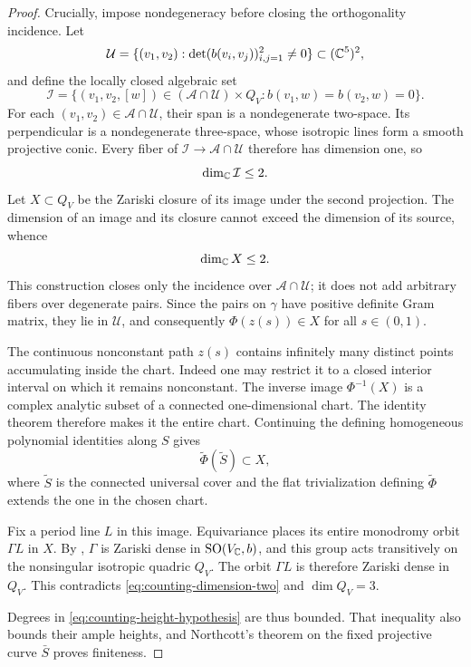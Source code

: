 \begin{proof}
Crucially, impose nondegeneracy before closing the orthogonality
incidence.  Let
\[
 \mathcal U=
 \{(v_1,v_2):\det(b(v_i,v_j))_{i,j=1}^2\ne0\}
 \subset(\mathbb C^5)^2,
\]
and define the locally closed algebraic set
\[
 \mathcal I=
 \{(v_1,v_2,[w])\in(\mathcal A\cap\mathcal U)\times Q_V:
       b(v_1,w)=b(v_2,w)=0\}.
\]
For each $(v_1,v_2)\in\mathcal A\cap\mathcal U$, their span is a
nondegenerate two-space.  Its perpendicular is a nondegenerate
three-space, whose isotropic lines form a smooth projective conic.
Every fiber of $\mathcal I\to\mathcal A\cap\mathcal U$ therefore
has dimension one, so
\[
 \dim_{\mathbb C}\mathcal I\le2.
\]
Let $X\subset Q_V$ be the Zariski closure of its image under
the second projection.  The dimension of an image and its closure
cannot exceed the dimension of its source, whence
\begin{equation}\label{eq:counting-dimension-two}
 \dim_{\mathbb C}X\le2.
\end{equation}
This construction closes only the incidence over
$\mathcal A\cap\mathcal U$; it does not add arbitrary fibers over
degenerate pairs.  Since the pairs on $\gamma$ have positive definite
Gram matrix, they lie in $\mathcal U$, and consequently
$\Phi(z(s))\in X$ for all $s\in(0,1)$.

The continuous nonconstant path $z(s)$ contains infinitely many distinct
points accumulating inside the chart.  Indeed one may restrict it to a
closed interior interval on which it remains nonconstant.  The inverse
image $\Phi^{-1}(X)$ is a complex analytic subset of a connected
one-dimensional chart.  The identity theorem therefore makes it the
entire chart.  Continuing the defining homogeneous polynomial
identities along $S$ gives
\[
 \widetilde\Phi(\widetilde S)\subset X,
\]
where $\widetilde S$ is the connected universal cover and the flat
trivialization defining $\widetilde\Phi$ extends the one in the chosen
chart.

Fix a period line $L$ in this image.  Equivariance places its entire
monodromy orbit $\Gamma L$ in $X$.  By ,
$\Gamma$ is Zariski dense in $\operatorname{SO}(V_{\mathbb C},b)$, and this group acts
transitively on the nonsingular isotropic quadric $Q_V$.
The orbit $\Gamma L$ is therefore Zariski dense in $Q_V$.
This contradicts \eqref{eq:counting-dimension-two} and
$\dim Q_V=3$.

Degrees in \eqref{eq:counting-height-hypothesis} are thus bounded.
That inequality also bounds their ample heights, and Northcott's
theorem on the fixed projective curve $\bar S$ proves finiteness.
\end{proof}

